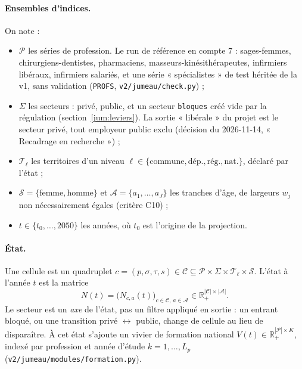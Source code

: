 \paragraph{Ensembles d'indices.} On note :
\begin{itemize}
  \item $\mathcal{P}$ les séries de profession. Le run de référence en compte 7\mesure{} : sages-femmes,
        chirurgiens-dentistes, pharmaciens, masseurs-kinésithérapeutes, infirmiers libéraux, infirmiers
        salariés, et une série « spécialistes » de test héritée de la v1, sans validation (\texttt{PROFS},
        \texttt{v2/jumeau/check.py}) ;
  \item $\Sigma$ les secteurs : privé, public, et un secteur \texttt{bloques} créé vide par la régulation
        (section~\ref{jum:leviers}). La sortie « libérale » du projet est le secteur privé, tout employeur
        public exclu (décision du 2026-11-14, « Recadrage en recherche ») ;
  \item $\mathcal{T}_\ell$ les territoires d'un niveau $\ell \in \{\text{commune}, \text{dép.}, \text{rég.},
        \text{nat.}\}$, déclaré par l'état ;
  \item $\mathcal{S} = \{\text{femme}, \text{homme}\}$ et $\mathcal{A} = \{a_1, \dots, a_J\}$ les tranches
        d'âge, de largeurs $w_j$ non nécessairement égales (critère C10) ;
  \item $t \in \{t_0, \dots, 2050\}$ les années, où $t_0$ est l'origine de la projection.
\end{itemize}

\paragraph{État.} Une cellule est un quadruplet $c = (p, \sigma, \tau, s) \in \mathcal{C} \subseteq
\mathcal{P} \times \Sigma \times \mathcal{T}_\ell \times \mathcal{S}$. L'état à l'année $t$ est la matrice
\begin{equation}\label{jum:eq:etat}
  N(t) = \bigl(N_{c,a}(t)\bigr)_{c \in \mathcal{C},\, a \in \mathcal{A}} \in \mathbb{R}_{+}^{|\mathcal{C}| \times
  |\mathcal{A}|}.
\end{equation}
Le secteur est un \emph{axe} de l'état, pas un filtre appliqué en sortie : un entrant bloqué, ou une transition
privé $\leftrightarrow$ public, change de cellule au lieu de disparaître. À cet état s'ajoute un vivier de
formation national $V(t) \in \mathbb{R}_{+}^{|\mathcal{P}| \times K}$, indexé par profession et année d'étude
$k = 1, \dots, L_p$ (\texttt{v2/jumeau/modules/formation.py}).

